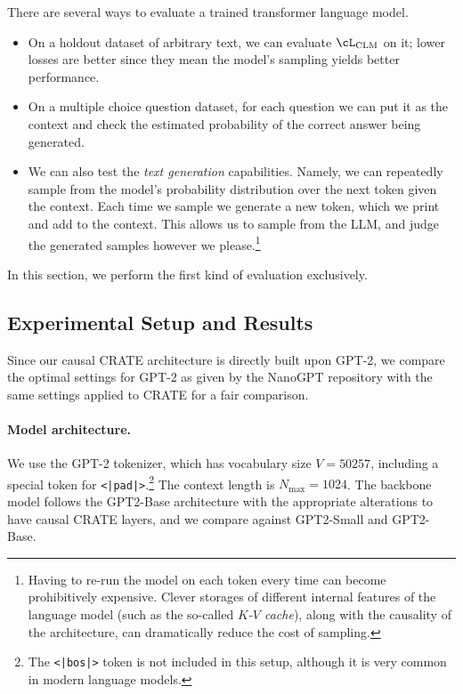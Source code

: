 \documentclass[../../book-main.tex]{subfiles}
\begin{document}
There are several ways to evaluate a trained transformer language model.
\begin{itemize}
    \item On a holdout dataset of arbitrary text, we can evaluate \(\cL_{\mathrm{CLM}}\) on it; lower losses are better since they mean the model's sampling yields better performance.
    \item On a multiple choice question dataset, for each question we can put it as the context and check the estimated probability of the correct answer being generated.
    \item We can also test the \textit{text generation} capabilities. Namely, we can repeatedly sample from the model's probability distribution over the next token given the context. Each time we sample we generate a new token, which we print and add to the context. This allows us to sample from the LLM, and judge the generated samples however we please.\footnote{Having to re-run the model on each token every time can become prohibitively expensive. Clever storages of different internal features of the language model (such as the so-called \textit{\(K\)-\(V\) cache}), along with the causality of the architecture, can dramatically reduce the cost of sampling.}
\end{itemize}
In this section, we perform the first kind of evaluation exclusively.

\subsection{Experimental Setup and Results}

Since our causal CRATE architecture is directly built upon GPT-2, we compare the optimal settings for GPT-2 as given by the NanoGPT repository \citep{nanogpt} with the same settings applied to CRATE for a fair comparison.

\paragraph{Model architecture.} We use the GPT-2 tokenizer, which has vocabulary size \(V = 50257\), including a special token for \texttt{<|pad|>}.\footnote{The \texttt{<|bos|>} token is not included in this setup, although it is very common in modern language models.} The context length is \(N_{\max} = 1024\). The backbone model follows the GPT2-Base architecture \citep{radford2019language} with the appropriate alterations to have causal CRATE layers, and we compare against GPT2-Small and GPT2-Base.
\end{document}
